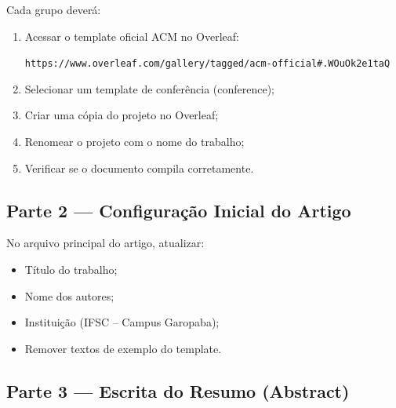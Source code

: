 \begin{boxAtividade}

Cada grupo deverá:

\begin{enumerate}
\item Acessar o template oficial ACM no Overleaf:

\texttt{https://www.overleaf.com/gallery/tagged/acm-official\#.WOuOk2e1taQ}

\item Selecionar um template de conferência (conference);

\item Criar uma cópia do projeto no Overleaf;

\item Renomear o projeto com o nome do trabalho;

\item Verificar se o documento compila corretamente.
\end{enumerate}

\end{boxAtividade}


\subsection{Parte 2 — Configuração Inicial do Artigo}

\begin{boxAtividade}

No arquivo principal do artigo, atualizar:

\begin{itemize}
\item Título do trabalho;
\item Nome dos autores;
\item Instituição (IFSC – Campus Garopaba);
\item Remover textos de exemplo do template.
\end{itemize}

\end{boxAtividade}


\subsection{Parte 3 — Escrita do Resumo (Abstract)}

